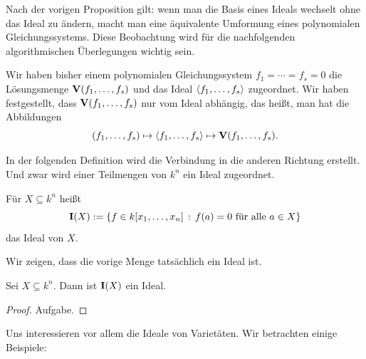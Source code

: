 \documentclass[11pt]{article}
\numberwithin{equation}{section}
\begin{document}
Nach der vorigen Proposition gilt: wenn man die Basis eines Ideals wechselt ohne das Ideal zu ändern, macht man eine äquivalente Umformung eines polynomialen Gleichungssystems. Diese Beobachtung wird für die nachfolgenden algorithmischen Überlegungen wichtig sein. 

Wir haben bisher einem polynomialen Gleichungssystem $f_1= \cdots = f_s=0$ die Lösungsmenge $\mathbf{V}(f_1,\ldots,f_s)$ und das Ideal $\left< f_1,\ldots,f_s \right>$ zugeordnet. Wir haben festgestellt, dass $\mathbf{V}(f_1,\ldots,f_s)$ nur vom Ideal abhängig, das heißt, man hat die Abbildungen 
\[
	(f_1,\ldots,f_s) \mapsto \left< f_1,\ldots,f_s \right> \mapsto \mathbf{V}(f_1,\ldots,f_s). 
\]

In der folgenden Definition wird die Verbindung in die anderen Richtung erstellt. Und zwar wird einer Teilmengen von $k^n$ ein Ideal zugeordnet. 

\begin{definition} 
	Für $X \subseteq k^n$ heißt
	\[
		 \mathbf{I}(X) := \left\{  f \in k[x_1,\ldots,x_n]  \,:\,  f(a) = 0 \ \text{für alle} \ a \in X \right\}
	\]
	das Ideal von $X$. 	
\end{definition} 

Wir zeigen, dass die vorige Menge tatsächlich ein Ideal ist. 

\begin{lemma} 
	Sei $X \subseteq k^n$. Dann ist $\mathbf{I}(X)$ ein Ideal. 
\end{lemma} 
\begin{proof}
	Aufgabe. 
\end{proof} 

Uns interessieren vor allem die Ideale von Varietäten. Wir betrachten einige Beispiele: 
\end{document}
